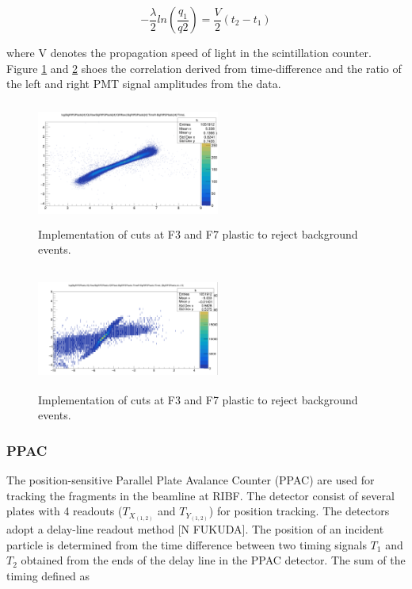 \begin{equation}\label{eq:11}
-\dfrac{\lambda}{2} ln \left ( \dfrac{q_{1}}{q{2}} \right ) = \dfrac{V}{2}(t_{2}-t_{1})
\end{equation}

where V denotes the propagation speed of light in the scintillation counter. Figure \ref{fig:F3_plastic_cut} and \ref{fig:F7_plastic_cut} shoes the correlation derived from time-difference and the ratio of the left and right PMT signal amplitudes from the data.

\begin{figure}[h]
	\centering
	\includegraphics[width=6cm,height=4cm]{figures/F3_plastic_cut.png}
	\caption[Implementation of cuts at F3 plastic to reject background events.]{Implementation of cuts at F3 and F7 plastic to reject background events.}
	\label{fig:F3_plastic_cut}
\end{figure}

\begin{figure}[h]
	\centering
	\includegraphics[width=6cm,height=4cm]{figures/F7_plastic_cut.png}
	\caption[Implementation of cuts at F7 plastic to reject background events.]{Implementation of cuts at F3 and F7 plastic to reject background events.}
	\label{fig:F7_plastic_cut}
\end{figure}

\subsubsection{PPAC}

The position-sensitive Parallel Plate Avalance Counter (PPAC) are used for tracking the fragments in the beamline at RIBF. The detector consist of several plates with 4 readouts ($T_{X_{(1, 2)}}$ and $T_{Y_{(1, 2)}}$) for position tracking. The detectors adopt a delay-line readout method [N FUKUDA]. The position of an incident particle is determined from the time difference between two timing signals $T_{1}$ and $T_{2}$ obtained from the ends of the delay line in the PPAC detector. The sum of the timing defined as 


